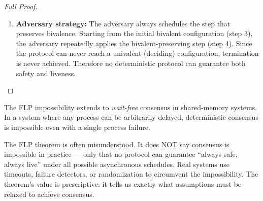 \begin{proof}[Full Proof]
\begin{enumerate}
If $p \neq q$, the two events commute: applying $e$ then $f$ from $C$ leads to the same configuration as $f$ then $e$. But this configuration would be both 0-valent (reachable from the 0-valent after $e$) and 1-valent (reachable from the 1-valent after $f$), contradiction.

If $p = q$, consider a third event $g$ applied to a different process $r$. Since $C$ is bivalent and $e$ leads to 0-valent, there must be some event (perhaps a crash) that leads away from 0-valent. Through careful scheduling, we can construct a contradiction using the fact that the 1-valent configuration reached by $f$ must also be reachable through alternative paths. The full proof in FLP handles this case by considering that from any bivalent $C$, there exists a sequence of events that preserves bivalence. The key insight: even if the adversary cannot immediately apply $e$ to a different process (since $e$ is tied to $p$), it can schedule a different event $g$ on process $r \neq p$, and from the resulting configuration, the adversary can again find a step that preserves bivalence. The inductive construction never terminates.

\item \textbf{Adversary strategy:} The adversary always schedules the step that preserves bivalence. Starting from the initial bivalent configuration (step 3), the adversary repeatedly applies the bivalent-preserving step (step 4). Since the protocol can never reach a univalent (deciding) configuration, termination is never achieved. Therefore no deterministic protocol can guarantee both safety and liveness.
\end{enumerate}
\end{proof}

\begin{corollary}
The FLP impossibility extends to \emph{wait-free} consensus in shared-memory systems. In a system where any process can be arbitrarily delayed, deterministic consensus is impossible even with a single process failure.
\end{corollary}

The FLP theorem is often misunderstood. It does NOT say consensus is impossible in practice — only that no protocol can guarantee ``always safe, always live'' under all possible asynchronous schedules. Real systems use timeouts, failure detectors, or randomization to circumvent the impossibility. The theorem's value is prescriptive: it tells us exactly what assumptions must be relaxed to achieve consensus.

